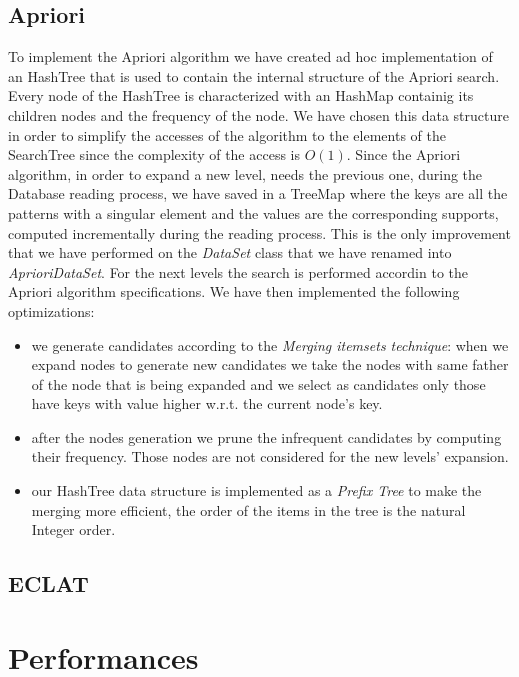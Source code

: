 \documentclass[11pt, a4paper]{article}
\begin{document}
		\subsection{Apriori}
			To implement the Apriori algorithm we have created ad hoc implementation of an HashTree that is used to contain the internal structure of the Apriori search. Every node of the HashTree is characterized with an HashMap containig its children nodes and the frequency of the node. 
			We have chosen this data structure in order to simplify the accesses of the algorithm to the elements of the SearchTree since the complexity of the access is $O(1)$.\newline
			Since the Apriori algorithm, in order to expand a new level, needs the previous one, during the Database reading process, we have saved in a TreeMap where the keys are all the patterns with a singular element and the values are the corresponding supports, computed incrementally during the reading process.\newline 
			This is the only improvement that we have performed on the \textit{DataSet} class that we have renamed into \textit{AprioriDataSet}.
			For the next levels the search is performed accordin to the Apriori algorithm specifications.
			\newline \newline
			We have then implemented the following optimizations:
			\begin{itemize}
				\item we generate candidates according to the \textit{Merging itemsets technique}: when we expand nodes to generate new candidates we take the nodes with same father of the node that is being expanded and we select as candidates only those have keys with value higher w.r.t. the current node's key.
				\item after the nodes generation we prune the infrequent candidates by computing their frequency. Those nodes are not considered for the new levels' expansion.
				\item our HashTree data structure is implemented as a \textit{Prefix Tree} to make the merging more efficient, the order of the items in the tree is the natural Integer order.
			\end{itemize}
		\subsection{ECLAT}
	\section{Performances}
		
\end{document}
